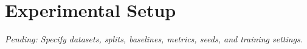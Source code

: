 \section{Experimental Setup}
\textit{Pending: Specify datasets, splits, baselines, metrics, seeds, and training settings.}
